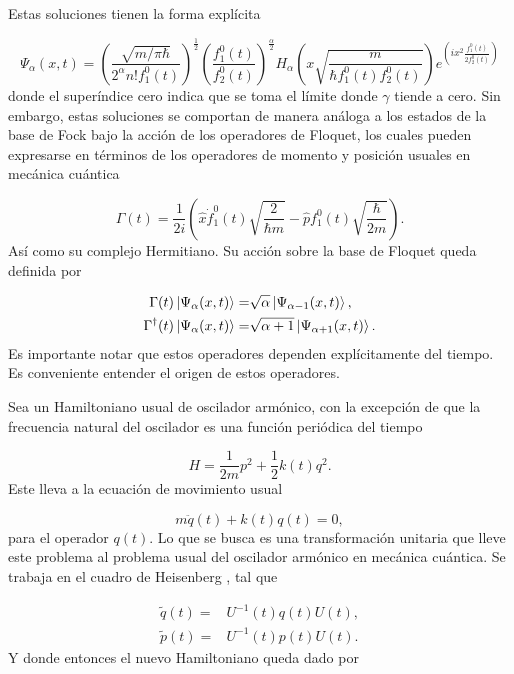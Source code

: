 \documentclass[10pt,a4paper]{report}
\begin{document}
Estas soluciones tienen la forma explícita\cite{BrownPT}

\begin{equation}
\Psi_\alpha (x,t) = (\frac{\sqrt{m/\pi\hbar}}{2^\alpha n! f_1^0(t)})^{\frac{1}{2}}(\frac{f_1^0(t)}{f_2^0(t)})^\frac{\alpha}{2}H_\alpha(x\sqrt{\frac{m}{\hbar f_1^0(t) f_2^0(t)}})e^{(ix^2\frac{f_1^0(t)}{2f_2^0(t)})}
\end{equation} donde el superíndice cero indica que se toma el límite donde $\gamma$ tiende a cero. Sin embargo, estas soluciones se comportan de manera análoga a los estados de la base de Fock bajo la acción de los operadores de Floquet, los cuales pueden expresarse en términos de los operadores de momento y posición usuales en mecánica cuántica

\begin{equation}\label{FloquetOperators}
\Gamma(t) = \frac{1}{2i}(\hat{x}\dot{f}_1^0(t)\sqrt{\frac{2}{\hbar m}}-\hat{p}f_1^0(t)\sqrt{\frac{\hbar}{2m}}).
\end{equation} Así como su complejo Hermitiano. Su acción sobre la base de Floquet queda definida por

\begin{align*}
\Gamma(t) \Ket{\Psi_\alpha (x,t)} =& \sqrt{\alpha}\Ket{\Psi_{\alpha-1} (x,t)}, \\
\Gamma^\dagger(t) \Ket{\Psi_\alpha (x,t)} =& \sqrt{\alpha+1}\Ket{\Psi_{\alpha+1} (x,t)}.
\end{align*}Es importante notar que estos operadores dependen explícitamente del tiempo. Es conveniente entender el origen de estos operadores. 

Sea un Hamiltoniano usual de oscilador armónico, con la excepción de que la frecuencia natural del oscilador es una función periódica del tiempo

\begin{equation}\label{TDHO}
H = \frac{1}{2m}p^2 + \frac{1}{2}k(t)q^2.
\end{equation} Este lleva a la ecuación de movimiento usual

\begin{equation}
m\ddot{q}(t) + k(t)q(t) = 0,
\end{equation} para el operador $q(t)$. Lo que se busca es una transformación unitaria que lleve este problema al problema usual del oscilador armónico en mecánica cuántica. Se trabaja en el cuadro de Heisenberg \cite{SakuraiQM}, tal que

\begin{align}
\tilde{q}(t) =& U^{-1}(t)q(t)U(t),\\
\tilde{p}(t) =& U^{-1}(t)p(t)U(t).
\end{align} Y donde entonces el nuevo Hamiltoniano queda dado por
\end{document}
